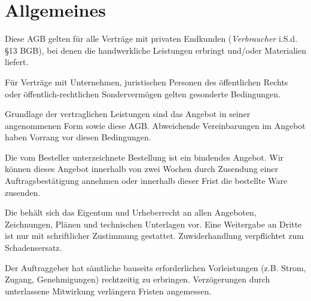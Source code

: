\documentclass[fontsize=12pt,parskip=half]{scrartcl}
\author{}
\begin{document}

\subject{\large Allgemeine Geschäftsbedingungen - Privatkunden}
\title{\large \companyName}
\subtitle{\normalsize \companyLocation}
\date{\small \effDate\ (V\version)}
\maketitle

\tableofcontents

\newpage

\section{Allgemeines}

\begin{contract}

\Clause[title={Geltungsbereich}]

Diese AGB gelten für alle Verträge mit privaten Endkunden (\emph{Verbraucher} i.S.d. §13 BGB), bei denen die \companyName{} handwerkliche Leistungen erbringt und/oder Materialien liefert. 

Für Verträge mit Unternehmen, juristischen Personen des öffentlichen Rechts oder öffentlich-rechtlichen Sondervermögen gelten gesonderte Bedingungen.


\Clause[title={Vertragsgrundlagen}]

Grundlage der vertraglichen Leistungen sind das Angebot in seiner angenommenen Form sowie diese AGB. Abweichende Vereinbarungen im Angebot haben Vorrang vor diesen Bedingungen.

Die vom Besteller unterzeichnete Bestellung ist ein bindendes Angebot. Wir können dieses Angebot innerhalb von zwei Wochen durch Zusendung einer Auftragsbestätigung annehmen oder innerhalb dieser Frist die bestellte Ware zusenden.

\Clause[title={Unterlagen, Eigentum und Rechte}]

Die \companyName{} behält sich das Eigentum und Urheberrecht an allen Angeboten, Zeichnungen, Plänen und technischen Unterlagen vor. Eine Weitergabe an Dritte ist nur mit schriftlicher Zustimmung gestattet. Zuwiderhandlung verpflichtet zum Schadensersatz.


\Clause[title={Mitwirkungspflichten}]

Der Auftraggeber hat sämtliche bauseits erforderlichen Vorleistungen (z.B. Strom, Zugang, Genehmigungen) rechtzeitig zu erbringen. Verzögerungen durch unterlassene Mitwirkung verlängern Fristen angemessen.

\end{contract}
\end{document}
